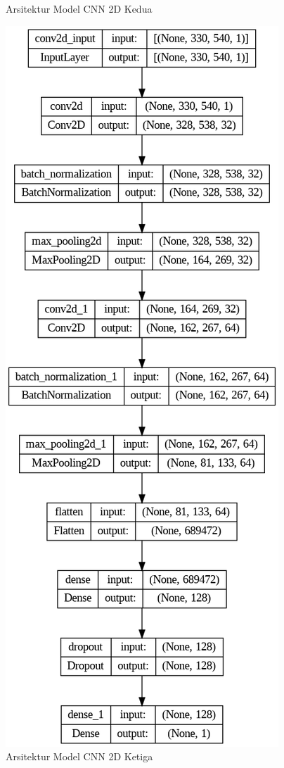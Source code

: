 \begin{figure} [H]
    \caption{Arsitektur Model CNN 2D Kedua}
    \label{fig:cnnarc2}
  \end{figure}

  \begin{figure} [H] \centering
    \includegraphics[scale=0.4]{gambar/bab3/cnnarc3.png}
    \caption{Arsitektur Model CNN 2D Ketiga}
    \label{fig:cnnarc3}
  \end{figure}

